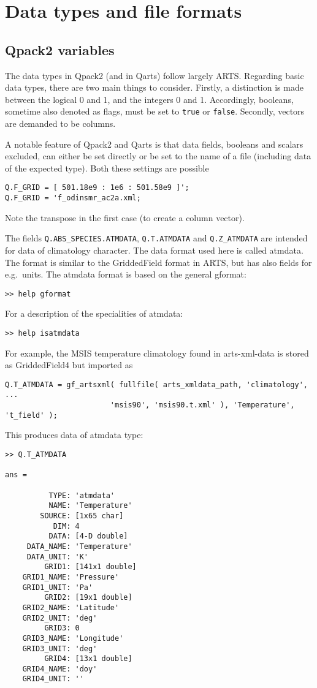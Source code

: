 \documentclass[a4paper,11pt]{article}
\begin{document}
\section{Data types and file formats}
\label{sec:formats}

\subsection{Qpack2 variables}
%
The data types in Qpack2 (and in Qarts) follow largely ARTS. Regarding basic
data types, there are two main things to consider. Firstly, a distinction is
made between the logical 0 and 1, and the integers 0 and 1. Accordingly,
booleans, sometime also denoted as flags, must be set to \verb|true| or
\verb|false|. Secondly, vectors are demanded to be columns.

A notable feature of Qpack2 and Qarts is that data fields, booleans and scalars
excluded, can either be set directly or be set to the name of a file (including
data of the expected type). Both these settings are possible
\begin{verbatim}
Q.F_GRID = [ 501.18e9 : 1e6 : 501.58e9 ]';
Q.F_GRID = 'f_odinsmr_ac2a.xml;
\end{verbatim}
Note the transpose in the first case (to create a column vector).

The fields \verb|Q.ABS_SPECIES.ATMDATA|, \verb|Q.T.ATMDATA| and
\verb|Q.Z_ATMDATA| are intended for data of climatology character. The data
format used here is called atmdata. The format is similar to the GriddedField
format in ARTS, but has also fields for e.g.\ units. The atmdata format is
based on the general gformat:
\begin{verbatim}
>> help gformat
\end{verbatim}
For a description of the specialities of atmdata:
\begin{verbatim}
>> help isatmdata
\end{verbatim}
For example, the MSIS temperature climatology found in arts-xml-data is stored
as GriddedField4 but imported as
\begin{verbatim}
Q.T_ATMDATA = gf_artsxml( fullfile( arts_xmldata_path, 'climatology', ...
                        'msis90', 'msis90.t.xml' ), 'Temperature', 't_field' );
\end{verbatim}
This produces data of atmdata type:
\begin{verbatim}
>> Q.T_ATMDATA

ans = 

          TYPE: 'atmdata'
          NAME: 'Temperature'
        SOURCE: [1x65 char]
           DIM: 4
          DATA: [4-D double]
     DATA_NAME: 'Temperature'
     DATA_UNIT: 'K'
         GRID1: [141x1 double]
    GRID1_NAME: 'Pressure'
    GRID1_UNIT: 'Pa'
         GRID2: [19x1 double]
    GRID2_NAME: 'Latitude'
    GRID2_UNIT: 'deg'
         GRID3: 0
    GRID3_NAME: 'Longitude'
    GRID3_UNIT: 'deg'
         GRID4: [13x1 double]
    GRID4_NAME: 'doy'
    GRID4_UNIT: ''
\end{verbatim}
\end{document}
